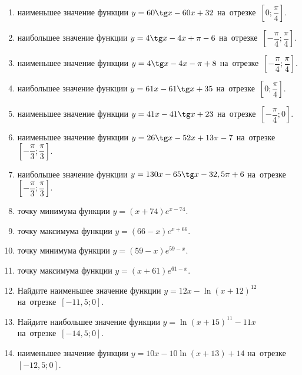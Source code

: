 \documentclass[a4paper,10pt]{article}
\begin{document}
\begin{enumerate}
\item {} наименьшее значение функции $y = 60\tg x-60x+32$ на~отрезке~$\left[0;\dfrac{\pi }{4}\right]$.

\item {} наибольшее значение функции $y=4\tg x-4x+\pi -6$ на~отрезке~$\left[-\dfrac{\pi }{4};\dfrac{\pi }{4}\right]$.

\item {} наименьшее значение функции $y=4\tg x-4x-\pi +8$ на~отрезке~$\left[-\dfrac{\pi }{4};\dfrac{\pi }{4}\right]$.

\item {} наибольшее значение функции $y = 61x-61\tg x +35$ на~отрезке~$\left[0;\dfrac{\pi }{4}\right]$.

\item {} наименьшее значение функции $y = 41x-41\tg x +23$ на~отрезке~$\left[-\dfrac{\pi }{4};0\right]$.

\item {} наименьшее значение функции $y = 26\tg x-52x+13 \pi -7$ на~отрезке~$\left[-\dfrac{\pi }{3};\dfrac{\pi }{3}\right]$.

\item {} наибольшее значение функции $y = 130x-65\tg x-32,5\pi +6$ на~отрезке~$\left[-\dfrac{\pi }{3};\dfrac{\pi }{3}\right]$.

\item {} точку минимума функции $y = \left(x+74\right)e^{x-74}$.

\item {} точку максимума функции $y = \left(66-x\right)e^{x+66}$.

\item {} точку минимума функции $y = \left(59-x\right)e^{59-x}$.

\item {} точку максимума функции $y = \left(x+61\right)e^{61-x}$.

\item Найдите наименьшее значение функции $y = 12x-\ln \left(x+12\right)^{12}$ на~отрезке~$\left[-11,5;0\right]$.

\item Найдите наибольшее значение функции $y = \ln \left(x+15\right)^{11}-11x$ на~отрезке~$\left[-14,5;0\right]$.

\item {} наименьшее значение функции $y = 10x-10\ln \left(x+13\right) +14$ на~отрезке~$\left[-12,5;0\right]$.


\end{enumerate}
\end{document}
